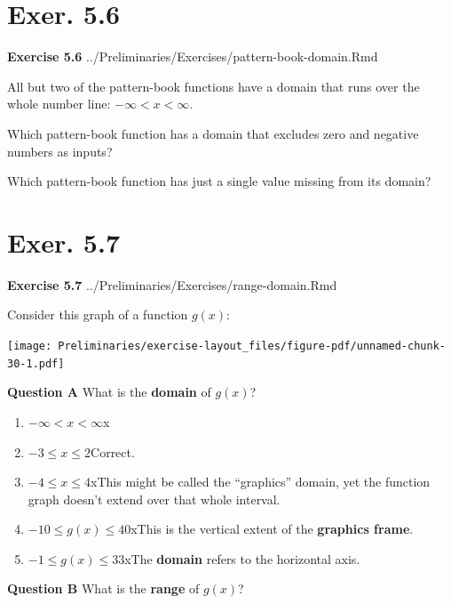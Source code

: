 \documentclass[
  letterpaper,
  DIV=11,
  numbers=noendperiod,
  oneside]{article}
\providecommand{\tightlist}{%
  \setlength{\itemsep}{0pt}\setlength{\parskip}{0pt}}\usepackage{longtable,booktabs,array}
\begin{document}
\begin{multicols}{2}
\hypertarget{exer.-5.6}{%
\section*{Exer. 5.6}\label{exer.-5.6}}

\textbf{Exercise 5.6} ../Preliminaries/Exercises/pattern-book-domain.Rmd

All but two of the pattern-book functions have a domain that runs over
the whole number line: \(-\infty < x < \infty\).

Which pattern-book function has a domain that excludes zero and negative
numbers as inputs?

Which pattern-book function has just a single value missing from its
domain?

\hypertarget{exer.-5.7}{%
\section*{Exer. 5.7}\label{exer.-5.7}}

\textbf{Exercise 5.7} ../Preliminaries/Exercises/range-domain.Rmd

Consider this graph of a function \(g(x)\):

\texttt{[image: Preliminaries/exercise-layout\_files/figure-pdf/unnamed-chunk-30-1.pdf]}

\textbf{Question A} What is the \textbf{domain} of \(g(x)\)?

\begin{enumerate}
\def\labelenumi{\roman{enumi}.}
\tightlist
\item
  {\(-\infty < x < \infty\){x}}\\
\item
  {\(-3 \leq x \leq 2\){Correct.~}}\\
\item
  {\(-4 \leq x \leq 4\){xThis might be called the ``graphics'' domain,
  yet the function graph doesn't extend over that whole interval.}}\\
\item
  {\(-10 \leq g(x) \leq 40\){xThis is the vertical extent of the
  \textbf{graphics frame}.}}\\
\item
  {\(-1 \leq g(x) \leq 33\){xThe \textbf{domain} refers to the
  horizontal axis.}}
\end{enumerate}

\textbf{Question B} What is the \textbf{range} of \(g(x)\)?


\end{multicols}
\end{document}

